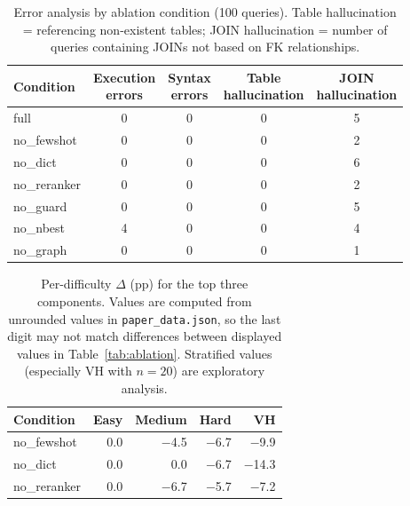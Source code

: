 \begin{table}[t]
  \centering
  \caption{Error analysis by ablation condition (100 queries).
  Table hallucination = referencing non-existent tables;
  JOIN hallucination = number of queries containing JOINs not based on FK relationships.}
  \label{tab:error_analysis}
  \footnotesize
  \begin{tabular}{lcccc}
    \toprule
    Condition & \shortstack{Execution\\errors} & \shortstack{Syntax\\errors} & \shortstack{Table\\hallucination} & \shortstack{JOIN\\hallucination} \\
    \midrule
    full          & 0 & 0 & 0 & 5 \\
    no\_fewshot   & 0 & 0 & 0 & 2 \\
    no\_dict      & 0 & 0 & 0 & 6 \\
    no\_reranker  & 0 & 0 & 0 & 2 \\
    no\_guard     & 0 & 0 & 0 & 5 \\
    no\_nbest     & 4 & 0 & 0 & 4 \\
    no\_graph     & 0 & 0 & 0 & 1 \\
    \bottomrule
  \end{tabular}
\end{table}

\begin{table}[t]
\centering
\caption{Per-difficulty $\Delta$ (pp) for the top three components. Values are computed from unrounded values in \texttt{paper\_data.json}, so the last digit may not match differences between displayed values in Table~\ref{tab:ablation}. Stratified values (especially VH with $n=20$) are exploratory analysis.}
\label{tab:ablation-detail}
\small
\begin{tabular}{@{}lrrrr@{}}
\toprule
Condition & Easy & Medium & Hard & VH \\
\midrule
no\_fewshot   &    0.0  & $-$4.5  & $-$6.7  & $-$9.9 \\
no\_dict      &    0.0  &    0.0  & $-$6.7  & $-$14.3 \\
no\_reranker  &    0.0  & $-$6.7  & $-$5.7  & $-$7.2  \\
\bottomrule
\end{tabular}
\end{table}

